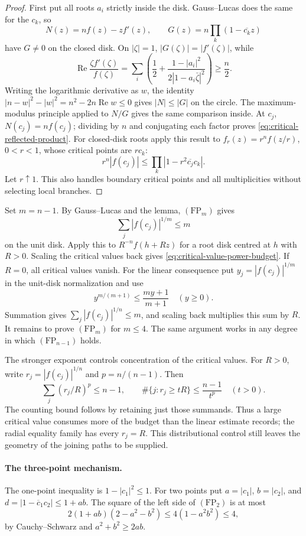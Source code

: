 \documentclass[11pt]{article}
\begin{document}
\begin{proof}
First put all roots $a_i$ strictly inside the disk.  Gauss--Lucas does the
same for the $c_k$, so
\[
 N(z)=nf(z)-zf'(z),\qquad
 G(z)=n\prod_k(1-\overline{c_k}z)
\]
have $G\ne0$ on the closed disk.  On $|\zeta|=1$,
$|G(\zeta)|=|f'(\zeta)|$, while
\[
 \operatorname{Re}\frac{\zeta f'(\zeta)}{f(\zeta)}
 =\sum_i\left(\frac12+
       \frac{1-|a_i|^2}{2|1-a_i\bar\zeta|^2}\right)\ge\frac n2.
\]
Writing the logarithmic derivative as $w$, the identity
$|n-w|^2-|w|^2=n^2-2n\operatorname{Re}w\le0$ gives
$|N|\le|G|$ on the circle.  The maximum-modulus principle applied to
$N/G$ gives the same comparison inside.  At $c_j$, $N(c_j)=nf(c_j)$;
dividing by $n$ and conjugating each factor proves
\eqref{eq:critical-reflected-product}.
For closed-disk roots apply this result to
$f_r(z)=r^nf(z/r)$, $0<r<1$, whose critical points are $rc_k$:
\[
 r^n|f(c_j)|\le\prod_k|1-r^2\overline{c_j}c_k|.
\]
Let $r\uparrow1$.  This also handles boundary critical points and all
multiplicities without selecting local branches.
\end{proof}

Set $m=n-1$. By Gauss--Lucas and the lemma, $(\mathrm{FP}_m)$ gives
\[
 \sum_j |f(c_j)|^{1/m}\le m
\]
on the unit disk. Apply this to $R^{-n}f(h+Rz)$ for a root disk
centred at $h$ with $R>0$. Scaling the critical values back gives
\eqref{eq:critical-value-power-budget}. If $R=0$, all critical values
vanish. For the linear consequence put $y_j=|f(c_j)|^{1/m}$ in the
unit-disk normalization and use
\[
 y^{m/(m+1)}\le\frac{my+1}{m+1}\quad(y\ge0).
\]
Summation gives $\sum_j|f(c_j)|^{1/n}\le m$, and scaling back multiplies
this sum by $R$. It remains to prove $(\mathrm{FP}_m)$ for $m\le4$.
The same argument works in any degree in which $(\mathrm{FP}_{n-1})$ holds.

The stronger exponent controls concentration of the critical values.
For $R>0$, write $r_j=|f(c_j)|^{1/n}$ and $p=n/(n-1)$. Then
\[
 \sum_j(r_j/R)^p\le n-1,\qquad
 \#\{j:r_j\ge tR\}\le\frac{n-1}{t^p}\quad(t>0).
\]
The counting bound follows by retaining just those summands. Thus a large
critical value consumes more of the budget than the linear estimate records;
the radial equality family has every $r_j=R$. This distributional control
still leaves the geometry of the joining paths to be supplied.

\paragraph{The three-point mechanism.}
The one-point inequality is $1-|c_1|^2\le1$.  For two points put
$a=|c_1|$, $b=|c_2|$, and $d=|1-\overline c_1c_2|\le1+ab$.
The square of the left side of $(\mathrm{FP}_2)$ is at most
\[
 2(1+ab)(2-a^2-b^2)\le4(1-a^2b^2)\le4,
\]
by Cauchy--Schwarz and $a^2+b^2\ge2ab$.
\end{document}

